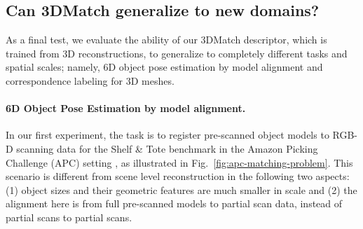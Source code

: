 \documentclass[10pt,twocolumn,letterpaper]{article}
\newcommand{\mypara}{\vspace*{-3mm}\paragraph}
\begin{document}
\subsection{Can 3DMatch generalize to new domains?}
\label{sec:generalization-new-domains}


As a final test, we evaluate the ability of our 3DMatch descriptor, which is trained from 3D reconstructions, to generalize to completely different tasks and spatial scales; namely, 6D object pose estimation by model alignment and correspondence labeling for 3D meshes.

\mypara{6D Object Pose Estimation by model alignment.}
In our first experiment, the task is to register pre-scanned object models to RGB-D scanning data for the Shelf \& Tote benchmark in the Amazon Picking Challenge (APC) setting \cite{zeng2016multi}, as illustrated in Fig.~\ref{fig:apc-matching-problem}. This scenario is different from scene level reconstruction in the following two aspects: (1) object sizes and their geometric features are much smaller in scale and (2) the alignment here is from full pre-scanned models to partial scan data, instead of partial scans to partial scans.
\end{document}
